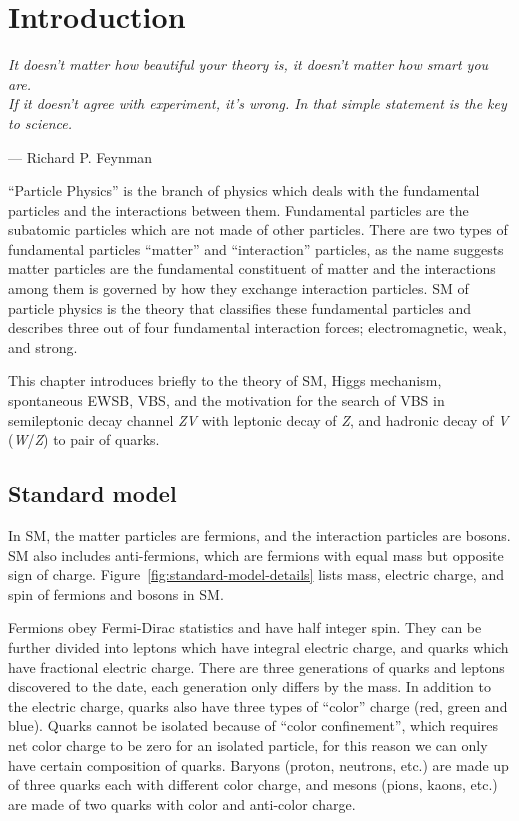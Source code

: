 \chapter{
  Introduction
 }\label{ch_intro}

\epigraph{\textit{It doesn't matter how beautiful your theory is,
    it doesn't matter how smart you are. \\
    If it doesn't agree with experiment, it's wrong.
    In that simple statement is the key to science.}}
{--- Richard P. Feynman}

``Particle Physics'' is the branch of physics which deals with the fundamental
particles and the interactions between them. Fundamental particles are the
subatomic particles which are not made of other particles.
There are two types of fundamental particles ``matter'' and ``interaction''
particles, as the name suggests matter particles are the fundamental constituent of matter and
the interactions among them is governed by how they exchange interaction particles.
\gls{SM} of particle physics is the theory that classifies these fundamental
particles and describes three out of four fundamental
interaction forces; electromagnetic, weak, and strong.

This chapter introduces briefly to the theory of \gls{SM}, Higgs mechanism,
spontaneous \gls{EWSB}, \gls{VBS}, and the motivation for the search of \gls{VBS}
in semileptonic decay channel \textit{ZV} with leptonic decay of \textit{Z},
and hadronic decay of \textit{V} (\textit{W}/\textit{Z}) to pair of quarks.

\section{
  Standard model
 }\label{ch_intro:standard-model}

In \gls{SM}, the matter particles are fermions, and
the interaction particles are bosons. \gls{SM} also includes
anti-fermions, which are fermions with equal mass but opposite sign of charge.
Figure~\ref{fig:standard-model-details} lists mass, electric charge,
and spin of fermions and bosons in \gls{SM}.

Fermions obey Fermi-Dirac statistics and have half integer spin. They can be further
divided into leptons which have integral electric charge, and quarks which have
fractional electric charge. There are three generations of quarks and leptons
discovered to the date, each generation only differs by the mass.
In addition to the electric charge, quarks also have
three types of ``color'' charge (red, green and blue). Quarks cannot be isolated
because of ``color confinement'', which requires net color charge to be zero
for an isolated particle, for this reason we can only have certain composition
of quarks. Baryons (proton, neutrons, etc.) are made up of three quarks
each with different color charge,
and mesons (pions, kaons, etc.) are made of two quarks with color and anti-color charge.

